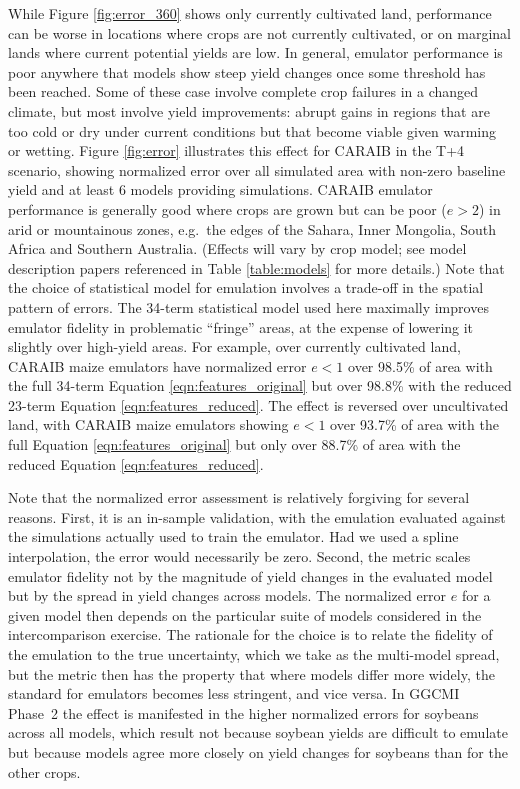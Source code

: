 \documentclass[gmdd]{copernicus} %
\begin{document}
While Figure \ref{fig:error_360} shows only currently cultivated land, performance can be worse in locations where crops are not currently cultivated, or on marginal lands where current potential yields are low. In general, emulator performance is poor anywhere that models show steep yield changes once some threshold has been reached. Some of these case involve complete crop failures in a changed climate, but most involve yield improvements: abrupt gains in regions that are too cold or dry under current conditions but that become viable given warming or wetting.
Figure \ref{fig:error} illustrates this effect for CARAIB in the T+4 scenario, showing normalized error over all simulated area with non-zero baseline yield and at least 6 models providing simulations. CARAIB emulator performance is generally good where crops are grown but can be poor ($e > 2$) in arid or mountainous zones, e.g.\ the edges of the Sahara, Inner Mongolia, South Africa and Southern Australia. %
(Effects will vary by crop model; see model description papers referenced in Table \ref{table:models} for more details.)
Note that the choice of statistical model for emulation involves a trade-off in the spatial pattern of errors. The 34-term statistical model used here maximally improves emulator fidelity in problematic ``fringe'' areas, at the expense of lowering it slightly over high-yield areas.
For example, over currently cultivated land, CARAIB maize emulators have normalized error $e < 1$ over 98.5\% of area with the full 34-term Equation \ref{eqn:features_original} but over 98.8\% with the reduced 23-term Equation \ref{eqn:features_reduced}. 
The effect is reversed over uncultivated land, with CARAIB maize emulators showing $e < 1$ over 93.7\% of area with the full Equation \ref{eqn:features_original} but only over 88.7\% of area with the reduced Equation \ref{eqn:features_reduced}.  

Note that the normalized error assessment is relatively forgiving for several reasons. 
First, it is an in-sample validation, with the emulation evaluated against the simulations actually used to train the emulator. 
Had we used a spline interpolation, the error would necessarily be zero. 
Second, the metric scales emulator fidelity not by the magnitude of yield changes in the evaluated model but by the spread in yield changes across models. 
The normalized error $e$ for a given model then depends on the particular suite of models considered in the intercomparison exercise.  
The rationale for the choice is to relate the fidelity of the emulation to the true uncertainty, which we take as the multi-model spread, but  
the metric then has the property that where models differ more widely, the standard for emulators becomes less stringent, and vice versa.
In GGCMI Phase~2 the effect is manifested in the higher normalized errors for soybeans across all models, which result not because soybean yields are difficult to emulate but because models agree more closely on yield changes for soybeans than for the other crops.
\end{document}
